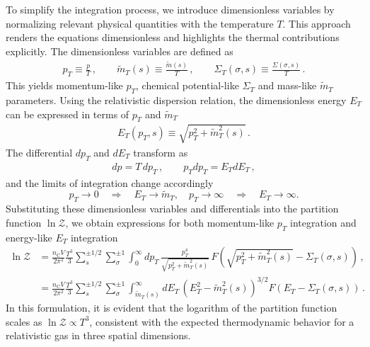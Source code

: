 \documentclass[epjST]{svjour}
\begin{document}
To simplify the integration process, we introduce dimensionless variables by normalizing relevant physical quantities with the temperature \( T \). This approach renders the equations dimensionless and highlights the thermal contributions explicitly. The dimensionless variables are defined as
\begin{align}
\label{eq:dimensionless_variables}
p_{T} \equiv \frac{p}{T}\,, \qquad \tilde{m}_{T}(s) \equiv \frac{\tilde{m}(s)}{T}\,, \qquad \Sigma_{T}(\sigma,s) \equiv \frac{\Sigma(\sigma,s)}{T}\,.
\end{align}
This yields momentum-like \(p_{T}\), chemical potential-like \(\Sigma_{T}\) and mass-like \(\tilde{m}_{T}\) parameters. Using the relativistic dispersion relation, the dimensionless energy \(E_{T}\) can be expressed in terms of \(p_{T}\) and \(\tilde{m}_{T}\)
\begin{align}
E_{T}(p_{T},s) \equiv \sqrt{p_{T}^{2} + \tilde{m}_{T}^{2}(s)}\,.
\end{align}
The differential \( dp_{T} \) and \( dE_{T} \) transform as
\begin{align}
dp = T \, dp_{T}\,,\qquad p_{T}dp_{T} = E_{T} dE_{T}\,,
\end{align}
and the limits of integration change accordingly
\begin{equation}
p_{T} \to 0 \quad \Rightarrow \quad E_{T} \to \tilde{m}_{T}, \quad p_{T} \to \infty \quad \Rightarrow \quad E_{T} \to \infty.
\end{equation}
Substituting these dimensionless variables and differentials into the partition function \( \ln\mathcal{Z} \), we obtain expressions for both momentum-like \(p_{T}\) integration and energy-like \(E_{T}\) integration
\begin{align}
\label{eq:dimensionless_partition}
\ln\mathcal{Z} 
&= \frac{n_\mathrm{C} V}{2\pi^{2}} \frac{T^{3}}{3} \sum_{s}^{\pm1/2}\sum_{\sigma}^{\pm1} \int_{0}^{\infty} dp_{T} \, \frac{p_{T}^{4}}{\sqrt{p_{T}^{2} + \tilde{m}_{T}^{2}(s)}} \, F\left(\sqrt{p_{T}^{2} + \tilde{m}_{T}^{2}(s)} - \Sigma_{T}(\sigma,s)\right)\,,\\
\label{eq:dimensionless_partition2}
&= \frac{n_\mathrm{C} V}{2\pi^{2}} \frac{T^{3}}{3} \sum_{s}^{\pm1/2}\sum_{\sigma}^{\pm1} \int_{\tilde{m}_{T}(s)}^{\infty} dE_{T} \, (E_{T}^2-\tilde{m}_{T}^{2}(s))^{3/2} F\left(E_{T} - \Sigma_{T}(\sigma,s)\right)\,.
\end{align}
In this formulation, it is evident that the logarithm of the partition function scales as \( \ln\mathcal{Z} \propto T^{3} \), consistent with the expected thermodynamic behavior for a relativistic gas in three spatial dimensions.
\end{document}
